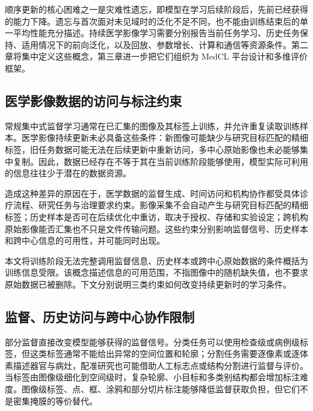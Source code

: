 顺序更新的核心困难之一是灾难性遗忘，即模型在学习后续阶段后，先前已经获得的能力下降\cite{delange2022continual}。遗忘与首次面对未见域时的泛化不足不同，也不能由训练结束后的单一平均性能充分描述。持续医学影像学习需要分别报告当前任务学习、历史任务保持、适用情况下的前向泛化，以及回放、参数增长、计算和通信等资源条件\cite{wang2024continualsurvey}。第二章将集中定义这些概念，第三章进一步把它们组织为 MedCL 平台设计和多维评价框架。

\subsection{医学影像数据的访问与标注约束}
\label{subsec:intro-incomplete-access}

常规集中式监督学习通常在已汇集的图像及其标签上训练，并允许重复读取训练样本。医学影像持续更新未必具备这些条件：新图像可能缺少与研究目标匹配的精细标签，旧任务数据可能无法在后续更新中重新访问，多中心原始影像也未必能够集中复制。因此，数据已经存在不等于其在当前训练阶段能够使用，模型实际可利用的信息往往少于潜在的数据资源\cite{willemink2020preparing,rieke2020future}。

造成这种差异的原因在于，医学数据的监督生成、时间访问和机构协作都受具体诊疗流程、研究任务与治理要求约束。影像采集不会自动产生与研究目标匹配的精细标签；历史样本是否可在后续优化中重访，取决于授权、存储和实验设定；跨机构原始影像能否汇集也不只是文件传输问题\cite{tajbakhsh2020imperfect,delange2022continual,rieke2020future,sheller2020federated}。这些约束分别影响监督信号、历史样本和跨中心信息的可用性，并可能同时出现。

本文将训练阶段无法完整调用监督信息、历史样本或跨中心原始数据的条件概括为训练信息受限。该概念描述信息的可用范围，不指图像中的随机缺失值，也不要求原始数据已被删除。下文分别说明三类约束如何改变持续更新时的学习条件。

\subsection{监督、历史访问与跨中心协作限制}
\label{subsec:intro-three-incomplete-dimensions}

部分监督直接改变模型能够获得的监督信号。分类任务可以使用检查级或病例级标签，但这类标签通常不能给出异常的空间位置和轮廓；分割任务需要逐像素或逐体素描述器官与病灶，配准研究也可能借助人工标志点或结构分割进行监督与评价。当标签由图像级细化到空间级时，复杂轮廓、小目标和多类别结构都会增加标注难度。图像级标签、点、框、涂鸦和部分切片标注能够降低监督获取负担，但它们不是密集掩膜的等价替代\cite{tajbakhsh2020imperfect}。

